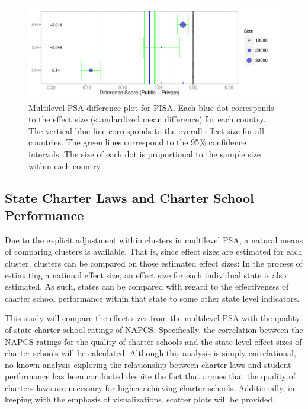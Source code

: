 \documentclass[letterpaper,12p,twoside]{article} %
\begin{document}
\begin{figure}[h!]
\begin{center}
\includegraphics[width=\textwidth]{../Figures/pisadiffplot.pdf}
\caption[Multilevel PSA difference plot for PISA]{Multilevel PSA difference plot for PISA. Each blue dot corresponds to the effect size (standardized mean difference) for each country. The vertical blue line corresponds to the overall effect size for all countries. The green lines correspond to the 95\% confidence intervals. The size of each dot is proportional to the sample size within each country.}
\end{center}
\end{figure}

\subsection{State Charter Laws and Charter School Performance}

Due to the explicit adjustment within clusters in multilevel PSA, a natural means of comparing clusters is available. That is, since effect sizes are estimated for each cluster, clusters can be compared on those estimated effect sizes: In the process of estimating a national effect size, an effect size for each individual state is also estimated. As such, states can be compared with regard to the effectiveness of charter school performance within that state to some other state level indicators.

This study will compare the effect sizes from the multilevel PSA with the quality of state charter school ratings of NAPCS. Specifically, the correlation between the NAPCS ratings for the quality of charter schools and the state level effect sizes of charter schools will be calculated. Although this analysis is simply correlational, no known analysis exploring the relationship between charter laws and student performance has been conducted despite the fact that  argues that the quality of charters laws are necessary for higher achieving charter schools. Additionally, in keeping with the emphasis of visualizations, scatter plots will be provided.
\end{document}
